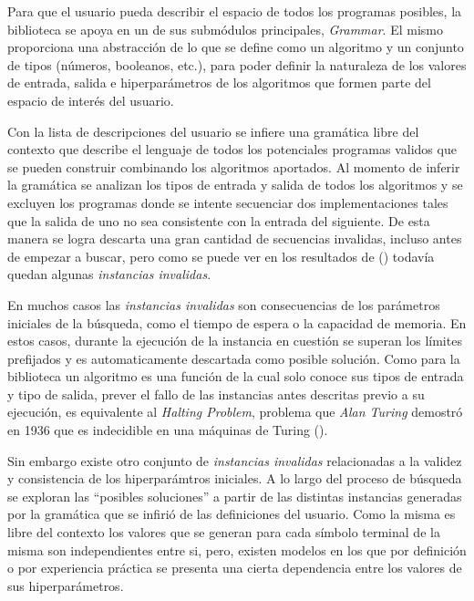 Para que el usuario pueda describir el espacio de todos los programas posibles,
la biblioteca se apoya en un de sus submódulos principales, {\it Grammar}. El mismo
proporciona una abstracción de lo que se define como un algoritmo y un conjunto
de tipos (números, booleanos, etc.), para poder definir la naturaleza de los
valores de entrada, salida e hiperparámetros de los algoritmos que formen parte
del espacio de interés del usuario.

Con la lista de descripciones del usuario se infiere una gramática libre
del contexto que describe el lenguaje de todos los potenciales programas validos
que se pueden construir combinando los algoritmos aportados. Al momento de inferir
la gramática se analizan los tipos de entrada y salida de todos los algoritmos y se
excluyen los programas donde se intente secuenciar dos implementaciones tales que
la salida de uno no sea consistente con la entrada del siguiente. De esta
manera se logra descarta una gran cantidad de secuencias invalidas, incluso
antes de empezar a buscar, pero como se puede ver en los resultados de (\cite{estevez-velarde-etal-2019-automl})
todavía quedan algunas {\it instancias invalidas}.

En muchos casos las {\it instancias invalidas} son consecuencias de los
parámetros iniciales de la búsqueda, como el tiempo de espera o la capacidad de memoria.
En estos casos, durante la ejecución de la instancia en cuestión se superan los límites
prefijados y es automaticamente descartada como posible solución. Como para la
biblioteca un algoritmo es una función de la cual solo conoce sus tipos de entrada y
tipo de salida, prever el fallo de las instancias antes descritas previo a su ejecución,
es equivalente al {\it Halting Problem}, problema que {\it Alan Turing} demostró en 1936
que es indecidible en una máquinas de Turing (\cite{Hopcroft+Ullman/79/Introduction}).

Sin embargo existe otro conjunto de {\it instancias invalidas} relacionadas a la validez
y consistencia de los hiperparámtros iniciales. A lo largo del proceso de búsqueda
se exploran las ``posibles soluciones'' a partir de las distintas instancias generadas
por la gramática que se infirió de las definiciones del usuario. Como la misma
es libre del contexto los valores que se generan para cada símbolo terminal de la misma
son independientes entre si, pero, existen modelos en los que por definición o por
experiencia práctica se presenta una cierta dependencia entre los valores de sus
hiperparámetros.

